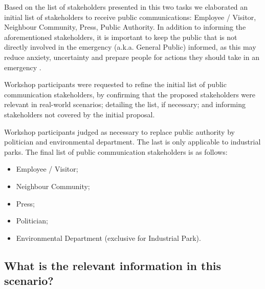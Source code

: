 Based on the list of stakeholders presented in this two tasks we elaborated an initial list of stakeholders to receive public communications: Employee / Visitor, Neighbour Community, Press, Public Authority. In addition to informing the aforementioned stakeholders, it is important to keep the public that is not directly involved in the emergency (a.k.a. General Public) informed, as this may reduce anxiety, uncertainty and prepare people for actions they should take in an emergency \cite{cdc2014}.

Workshop participants were requested to refine the initial list of public communication stakeholders, by confirming that the proposed stakeholders were relevant in real-world scenarios; detailing the list, if necessary; and informing stakeholders not covered by the initial proposal.

Workshop participants judged as necessary to replace public authority by politician and environmental department. The last is only applicable to industrial parks. The final list of public communication stakeholders is as follows:


\begin{itemize}
   \item Employee / Visitor;
   \item Neighbour Community;
   \item Press;
   \item Politician;
   \item Environmental Department (exclusive for Industrial Park).
        
 \end{itemize}


\subsection*{What is the relevant information in this scenario?}

